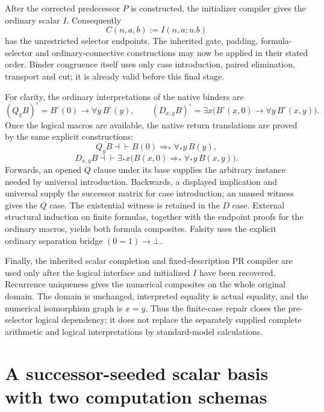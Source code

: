 \documentclass[11pt]{article}
\theoremstyle{definition}
\begin{document}
After the corrected predecessor $P$ is constructed, the initializer
compiler gives the ordinary scalar $I$.  Consequently
\[
 C(n,a,b):=I(n,a;u.b)
\]
has the unrestricted selector endpoints.  The inherited gate, padding,
formula-selector and ordinary-connective constructions may now be applied
in their stated order.  Binder congruence itself uses only case
introduction, paired elimination, transport and cut; it is already valid
before this final stage.

For clarity, the ordinary interpretations of the native binders are
\[
 (Q_yB)^\circ=B^\circ(0)\to\forall y\,B^\circ(y),\qquad
 (D_{x,y}B)^\circ=
 \exists x\bigl(B^\circ(x,0)\to\forall y\,B^\circ(x,y)\bigr).
\]
Once the logical macros are available, the native return translations
are proved by the same explicit constructions:
\[
 Q_yB\dashv\vdash B(0)\Rightarrow_*\forall_*y\,B(y),
\]
\[
 D_{x,y}B\dashv\vdash
 \exists_*x\bigl(B(x,0)\Rightarrow_*\forall_*y\,B(x,y)\bigr).
\]
Forwards, an opened $Q$ clause under its base supplies the arbitrary
instance needed by universal introduction.  Backwards, a displayed
implication and universal supply the successor matrix for case
introduction; an unused witness gives the $Q$ case.  The existential
witness is retained in the $D$ case.  External structural induction on
finite formulas, together with the endpoint proofs for the ordinary
macros, yields both formula composites.  Falsity uses the explicit
ordinary separation bridge $(0=1)\to\bot$.

Finally, the inherited scalar completion and fixed-description PR
compiler are used only after the logical interface and initialized $I$
have been recovered.  Recurrence uniqueness gives the numerical
composites on the whole original domain.  The domain is unchanged,
interpreted equality is actual equality, and the numerical isomorphism
graph is $x=y$.  Thus the finite-case repair closes the pre-selector
logical dependency; it does not replace the separately supplied complete
arithmetic and logical interpretations by standard-model calculations.



\section{A successor-seeded scalar basis with two computation schemas}
\label{js:section}
\end{document}
